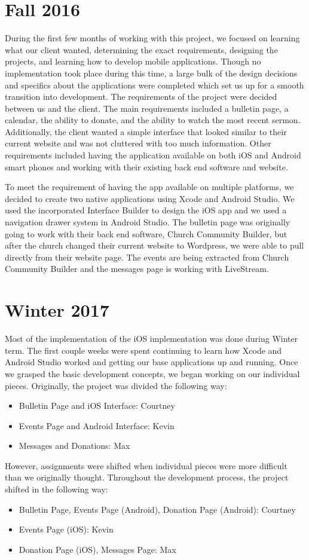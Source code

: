 \documentclass[letterpaper,10pt,draftclsnofoot,onecolumn,titlepage]{IEEEtran}
\begin{document}
\section{Fall 2016}
		During the first few months of working with this project, we focused on learning what our client wanted, determining the exact requirements, designing the projects, and learning how to develop mobile applications.
		 Though no implementation took place during this time, a large bulk of the design decisions and specifics about the applications were completed which set us up for a smooth transition into development. 
		The requirements of the project were decided between us and the client. 
		The main requirements included a bulletin page, a calendar, the ability to donate, and the ability to watch the most recent sermon. 
		Additionally, the client wanted a simple interface that looked similar to their current website and was not cluttered with too much information. 
		Other requirements included having the application available on both iOS and Android smart phones and working with their existing back end software and website. 
		
		To meet the requirement of having the app available on multiple platforms, we decided to create two native applications using Xcode and Android Studio. 
		We used the incorporated Interface Builder to design the iOS app and we used a navigation drawer system in Android Studio. 
		The bulletin page was originally going to work with their back end software, Church Community Builder, but after the church changed their current website to Wordpress, we were able to pull directly from their website page. 
		The events are being extracted from Church Community Builder and the messages page is working with LiveStream. 
	
		
\section{Winter 2017}
		Most of the implementation of the iOS implementation was done during Winter term. 
		The first couple weeks were spent continuing to learn how Xcode and Android Studio worked and getting our base applications up and running. 
		Once we grasped the basic development concepts, we began working on our individual pieces.
		Originally, the project was divided the following way: 
		\begin {itemize}
			\item Bulletin Page and iOS Interface: Courtney
			\item Events Page and Android Interface: Kevin
			\item Messages and Donations: Max
		\end {itemize}
		However, assignments were shifted when individual pieces were more difficult than we originally thought. 
		Throughout the development process, the project shifted in the following way: 
		\begin {itemize}
			\item Bulletin Page, Events Page (Android), Donation Page (Android): Courtney
			\item Events Page (iOS): Kevin
			\item Donation Page (iOS), Messages Page: Max
		\end {itemize}
			
\end{document}
